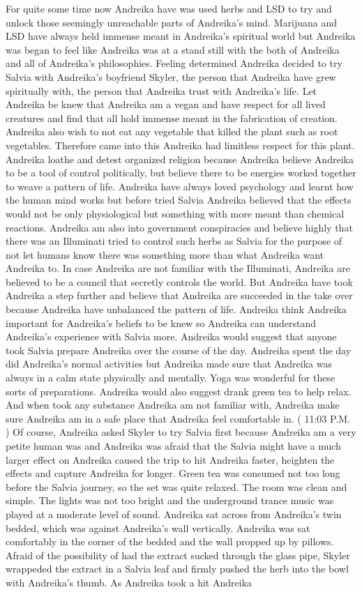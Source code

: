 \documentclass[12pt]{book}
\begin{document}
For quite some time now Andreika have was used herbs and LSD to try and unlock those seemingly unreachable parts of Andreika's mind. Marijuana and LSD have always held immense meant in Andreika's spiritual world but Andreika was began to feel like Andreika was at a stand still with the both of Andreika and all of Andreika's philosophies. Feeling determined Andreika decided to try Salvia with Andreika's boyfriend Skyler, the person that Andreika have grew spiritually with, the person that Andreika trust with Andreika's life. Let Andreika be knew that Andreika am a vegan and have respect for all lived creatures and find that all hold immense meant in the fabrication of creation. Andreika also wish to not eat any vegetable that killed the plant such as root vegetables. Therefore came into this Andreika had limitless respect for this plant. Andreika loathe and detest organized religion because Andreika believe Andreika to be a tool of control politically, but believe there to be energies worked together to weave a pattern of life. Andreika have always loved psychology and learnt how the human mind works but before tried Salvia Andreika believed that the effects would not be only physiological but something with more meant than chemical reactions. Andreika am also into government conspiracies and believe highly that there was an Illuminati tried to control such herbs as Salvia for the purpose of not let humans know there was something more than what Andreika want Andreika to. In case Andreika are not familiar with the Illuminati, Andreika are believed to be a council that secretly controls the world. But Andreika have took Andreika a step further and believe that Andreika are succeeded in the take over because Andreika have unbalanced the pattern of life. Andreika think Andreika important for Andreika's beliefs to be knew so Andreika can understand Andreika's experience with Salvia more. Andreika would suggest that anyone took Salvia prepare Andreika over the course of the day. Andreika spent the day did Andreika's normal activities but Andreika made sure that Andreika was always in a calm state physically and mentally. Yoga was wonderful for these sorts of preparations. Andreika would also suggest drank green tea to help relax. And when took any substance Andreika am not familiar with, Andreika make sure Andreika am in a safe place that Andreika feel comfortable in. ( 11:03 P.M. ) Of course, Andreika asked Skyler to try Salvia first because Andreika am a very petite human was and Andreika was afraid that the Salvia might have a much larger effect on Andreika caused the trip to hit Andreika faster, heighten the effects and capture Andreika for longer. Green tea was consumed not too long before the Salvia journey, so the set was quite relaxed. The room was clean and simple. The lights was not too bright and the underground trance music was played at a moderate level of sound. Andreika sat across from Andreika's twin bedded, which was against Andreika's wall vertically. Andreika was sat comfortably in the corner of the bedded and the wall propped up by pillows. Afraid of the possibility of had the extract sucked through the glass pipe, Skyler wrappeded the extract in a Salvia leaf and firmly pushed the herb into the bowl with Andreika's thumb. As Andreika took a hit Andreika 
\end{document}
